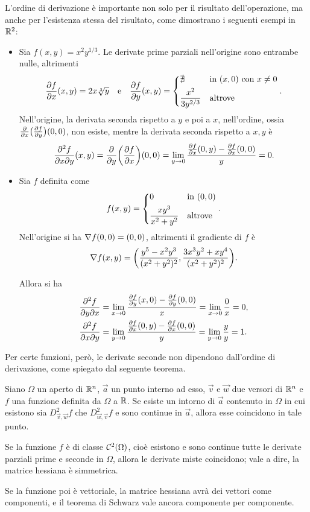 L'ordine di derivazione è importante non solo per il risultato dell'operazione, ma anche per l'esistenza stessa del risultato, come dimostrano i seguenti esempi in $\mathbb{R}^2$:
\begin{itemize}
\item Sia $f(x,y)=x^2y^{1/3}$. Le derivate prime parziali nell'origine sono entrambe nulle, altrimenti
\[
\drp{f}{x}(x,y)=2x\sqrt[3]{y}\qeq\drp{f}{y}(x,y)=\begin{dcases*}\nexists&in $(x,0)$ con $x\neq 0$\\\frac{x^2}{3y^{2/3}}&altrove\end{dcases*}.
\]
Nell'origine, la derivata seconda rispetto a $y$ e poi a $x$, nell'ordine, ossia $\frac{\partial}{\partial x}\big(\frac{\partial f}{\partial y}\big)(0,0)$, non esiste, mentre la derivata seconda rispetto a $x,y$ è
\[
\frac{\partial^2f}{\partial x\partial y}(x,y)=\frac{\partial {}}{\partial {y}}\bigg(\frac{\partial {f}}{\partial {x}}\bigg)(0,0)=\lim_{y\to 0}\frac{\frac{\partial f}{\partial x}(0,y)-\frac{\partial f}{\partial x}(0,0)}{y}=0.
\]
\item Sia $f$ definita come
\[
f(x,y)=\begin{dcases*}0&in $(0,0)$\\\frac{xy^3}{x^2+y^2}&altrove\end{dcases*}.
\]
Nell'origine si ha $\nabla f(0,0)=(0,0)$, altrimenti il gradiente di $f$ è
\[
\nabla f(x,y)=\bigg(\frac{y^5-x^2y^3}{(x^2+y^2)^2},\frac{3x^3y^2+xy^4}{(x^2+y^2)^2}\bigg).
\]

Allora si ha
\begin{align*}
&\frac{\partial^2f}{\partial y\partial x}=\lim_{x\to 0}\frac{\frac{\partial f}{\partial y}(x,0)-\frac{\partial f}{\partial y}(0,0)}{x}=\lim_{x\to 0}\frac0{x}=0,\\
&\frac{\partial^2f}{\partial x\partial y}=\lim_{y\to 0}\frac{\frac{\partial f}{\partial x}(0,y)-\frac{\partial f}{\partial x}(0,0)}{y}=\lim_{y\to 0}\frac{y}{y}=1.
\end{align*}
\end{itemize}
Per certe funzioni, però, le derivate seconde non dipendono dall'ordine di derivazione, come spiegato dal seguente teorema.
\begin{teorema}[di Schwartz] \label{t:schwarz}
Siano $\Omega$ un aperto di $\mathbb{R}^n$, $\vec a$ un punto interno ad esso, $\vec v$ e $\vec w$ due versori di $\mathbb{R}^n$ e $f$ una funzione definita da $\Omega$ a $\mathbb{R}$. Se esiste un intorno di $\vec a$ contenuto in $\Omega$ in cui esistono sia $D^2_{\vec v,\vec w}f$ che $D^2_{\vec w,\vec v}f$ e sono continue in $\vec a$, allora esse coincidono in tale punto.
\end{teorema}
\begin{corollario}
Se la funzione $f$ è di classe $\mathcal{C}^{{2}}(\Omega)$, cioè esistono e sono continue tutte le derivate parziali prime e seconde in $\Omega$, allora le derivate miste coincidono; vale a dire, la matrice hessiana è simmetrica.
\end{corollario}
Se la funzione poi è vettoriale, la matrice hessiana avrà dei vettori come componenti, e il teorema di Schwarz vale ancora componente per componente.%

